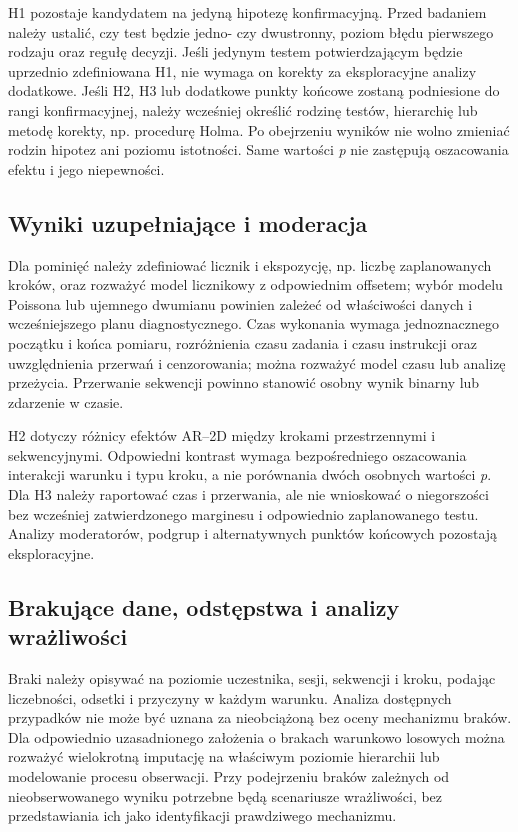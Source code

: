\documentclass[11pt,a4paper]{article}
\begin{document}
H1 pozostaje kandydatem na jedyną hipotezę konfirmacyjną. Przed badaniem należy ustalić, czy test będzie jedno- czy dwustronny, poziom błędu pierwszego rodzaju oraz regułę decyzji. Jeśli jedynym testem potwierdzającym będzie uprzednio zdefiniowana H1, nie wymaga on korekty za eksploracyjne analizy dodatkowe. Jeśli H2, H3 lub dodatkowe punkty końcowe zostaną podniesione do rangi konfirmacyjnej, należy wcześniej określić rodzinę testów, hierarchię lub metodę korekty, np. procedurę Holma. Po obejrzeniu wyników nie wolno zmieniać rodzin hipotez ani poziomu istotności. Same wartości \emph{p} nie zastępują oszacowania efektu i jego niepewności.

\subsection{Wyniki uzupełniające i moderacja}
Dla pominięć należy zdefiniować licznik i ekspozycję, np. liczbę zaplanowanych kroków, oraz rozważyć model licznikowy z odpowiednim offsetem; wybór modelu Poissona lub ujemnego dwumianu powinien zależeć od właściwości danych i wcześniejszego planu diagnostycznego. Czas wykonania wymaga jednoznacznego początku i końca pomiaru, rozróżnienia czasu zadania i czasu instrukcji oraz uwzględnienia przerwań i cenzorowania; można rozważyć model czasu lub analizę przeżycia. Przerwanie sekwencji powinno stanowić osobny wynik binarny lub zdarzenie w czasie.

H2 dotyczy różnicy efektów AR--2D między krokami przestrzennymi i sekwencyjnymi. Odpowiedni kontrast wymaga bezpośredniego oszacowania interakcji warunku i typu kroku, a nie porównania dwóch osobnych wartości \emph{p}. Dla H3 należy raportować czas i przerwania, ale nie wnioskować o niegorszości bez wcześniej zatwierdzonego marginesu i odpowiednio zaplanowanego testu. Analizy moderatorów, podgrup i alternatywnych punktów końcowych pozostają eksploracyjne.

\subsection{Brakujące dane, odstępstwa i analizy wrażliwości}
Braki należy opisywać na poziomie uczestnika, sesji, sekwencji i kroku, podając liczebności, odsetki i przyczyny w każdym warunku. Analiza dostępnych przypadków nie może być uznana za nieobciążoną bez oceny mechanizmu braków. Dla odpowiednio uzasadnionego założenia o brakach warunkowo losowych można rozważyć wielokrotną imputację na właściwym poziomie hierarchii lub modelowanie procesu obserwacji. Przy podejrzeniu braków zależnych od nieobserwowanego wyniku potrzebne będą scenariusze wrażliwości, bez przedstawiania ich jako identyfikacji prawdziwego mechanizmu.
\end{document}
